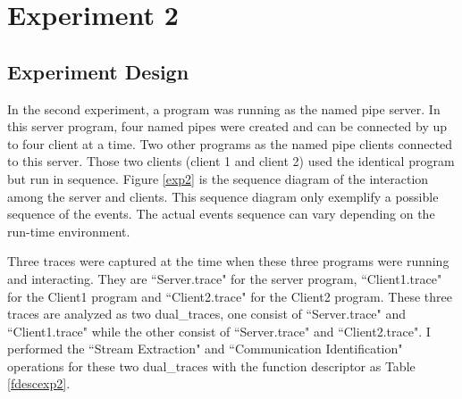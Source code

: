 \section{Experiment 2}
\subsection{Experiment Design}
In the second experiment, a program was running as the named pipe server. In this server program, four named pipes were created and can be connected by up to four client at a time. Two other programs as the named pipe clients connected to this server. Those two clients (client 1 and client 2) used the identical program but run in sequence. Figure \ref{exp2} is the sequence diagram of the interaction among the server and clients. This sequence diagram only exemplify a possible sequence of the events. The actual events sequence can vary depending on the run-time environment. 


Three traces were captured at the time when these three programs were running and interacting. They are ``Server.trace" for the server program, ``Client1.trace" for the Client1 program and ``Client2.trace" for the Client2 program. These three traces are analyzed as two dual\_traces, one consist of ``Server.trace" and ``Client1.trace" while the other consist of ``Server.trace" and ``Client2.trace". I performed the ``Stream Extraction" and ``Communication Identification" operations for these two dual\_traces with the function descriptor as Table \ref{fdescexp2}.



